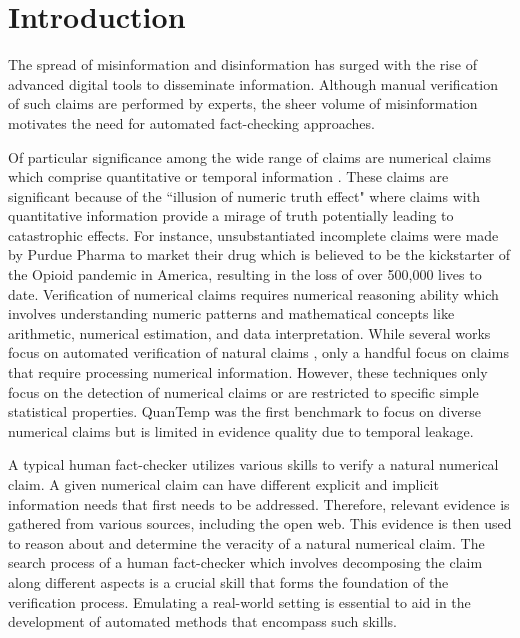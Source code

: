 \section{Introduction}


The spread of misinformation and disinformation has surged with the rise of advanced digital tools to disseminate information. Although manual verification of such claims are performed by experts, the sheer volume of misinformation motivates the need for automated fact-checking approaches\cite{cohen2011computation}. 

Of particular significance among the wide range of claims are numerical claims which comprise quantitative or temporal information \cite{quantemp}. These claims are significant because of the ``illusion of numeric truth effect" where claims with quantitative information provide a mirage of truth \cite{sagara2009consumer} potentially leading to catastrophic effects. For instance, unsubstantiated incomplete claims were made by Purdue Pharma to market their drug which is believed to be the kickstarter of the Opioid pandemic in America, resulting in the loss of over 500,000 lives to date\cite{van2009promotion}. Verification of numerical claims requires numerical reasoning ability which involves understanding numeric patterns and mathematical concepts like arithmetic, numerical estimation, and data interpretation.  While several works focus on automated verification of natural claims \cite{programFC,shah2022numerical,vlachos-riedel-2015-identification,shah2023concord,QVS}, only a handful focus on claims that require processing numerical information. However, these techniques only focus on the detection of numerical claims\cite{shah2023concord,shah2022numerical} or are restricted to specific simple statistical properties\cite{thorne-vlachos-2017-extensible,vlachos-riedel-2015-identification}. QuanTemp \cite{quantemp} was the first benchmark to focus on diverse numerical claims but is limited in evidence quality due to temporal leakage.

A typical human fact-checker utilizes various skills to verify a natural numerical claim. A given numerical claim can have different explicit and implicit information needs that first needs to be addressed.  Therefore, relevant evidence is gathered from various sources, including the open web. This evidence is then used to reason about and determine the veracity of a natural numerical claim.  The search process of a human fact-checker which involves decomposing the claim along different aspects is a crucial skill that forms the foundation of the verification process. Emulating a real-world setting is essential to aid in the development of automated methods that encompass such skills.

